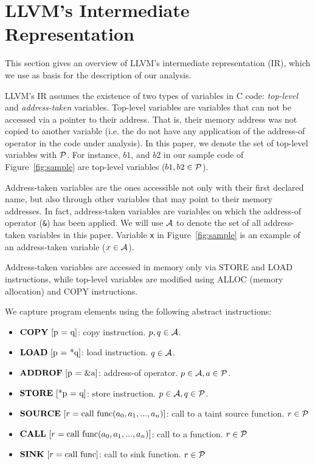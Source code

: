 \section{LLVM's Intermediate Representation}\label{sec:llvm}

This section gives an overview of LLVM's intermediate
representation (IR), which we use as basis for the
description of our analysis.

LLVM's IR assumes the existence of two types of variables
in C code: \textit{top-level} and \textit{address-taken}
variables.
Top-level variables are variables that can not be
accessed via a pointer to their address. That is,
their memory address was not copied to another variable
(i.e. the do not have any application of the address-of
operator in the code under analysis). In this paper, we
denote the set of top-level variables with $\mathcal{P}$.
For instance, $b1$, and $b2$ in our sample code of
Figure~\ref{fig:sample} are top-level
variables ($b1, b2 \in \mathcal{P}$).

Address-taken variables are the ones accessible not
only with their first declared name, but also through
other variables that may point to their memory addresses.
In fact, address-taken variables are variables on which the
address-of operator (\texttt{\&}) has been applied. We
will use $\mathcal{A}$ to denote the set of all address-taken
variables in this paper.
Variable \texttt{x} in Figure~\ref{fig:sample} is an example
of an address-taken variable ($x \in \mathcal{A}$).

Address-taken variables are accessed in memory only via
STORE and LOAD instructions, while top-level  variables
are modified using ALLOC (memory allocation) and COPY
instructions.

We capture program elements using the following abstract
instructions:
\begin{itemize}
\item $\copydef$: copy instruction. $p, q \in \mathcal{A}$.
\item $\loaddef$: load instruction. $q \in \mathcal{A}$.
\item $\addrofdef$: address-of operator. $p \in \mathcal{A}, a \in \mathcal{P}$.
\item $\storedef$: store instruction. $p \in \mathcal{A}, q \in \mathcal{P}$.
\item $\text{\textbf{SOURCE}}\ [r = \text{call}\ \text{func}(a_0, a_1, ..., a_n)]$: call to a taint source function. $r \in \mathcal{P}$
\item $\text{\textbf{CALL}}\ [r = \text{call}\ \text{func}(a_0, a_1, ..., a_n)]$: call to a function. $r \in \mathcal{P}$
\item $\text{\textbf{SINK}}\ [r = \text{call}\ \text{func}]$: call to sink function. $r \in \mathcal{P}$
\end{itemize}